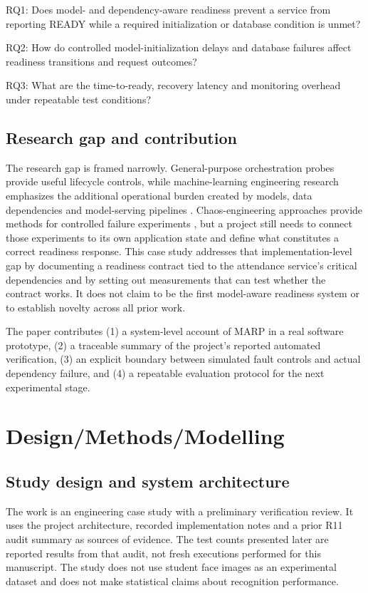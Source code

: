 \documentclass[11pt,a4paper]{article}
\begin{document}
RQ1: Does model- and dependency-aware readiness prevent a service from reporting READY while a required initialization or database condition is unmet?

RQ2: How do controlled model-initialization delays and database failures affect readiness transitions and request outcomes?

RQ3: What are the time-to-ready, recovery latency and monitoring overhead under repeatable test conditions?

\subsection{Research gap and contribution}

The research gap is framed narrowly. General-purpose orchestration probes provide useful lifecycle controls, while machine-learning engineering research emphasizes the additional operational burden created by models, data dependencies and model-serving pipelines \cite{Breck,Amershi}. Chaos-engineering approaches provide methods for controlled failure experiments \cite{Basiri}, but a project still needs to connect those experiments to its own application state and define what constitutes a correct readiness response. This case study addresses that implementation-level gap by documenting a readiness contract tied to the attendance service’s critical dependencies and by setting out measurements that can test whether the contract works. It does not claim to be the first model-aware readiness system or to establish novelty across all prior work.

The paper contributes (1) a system-level account of MARP in a real software prototype, (2) a traceable summary of the project’s reported automated verification, (3) an explicit boundary between simulated fault controls and actual dependency failure, and (4) a repeatable evaluation protocol for the next experimental stage.

\section{Design/Methods/Modelling}

\subsection{Study design and system architecture}

The work is an engineering case study with a preliminary verification review. It uses the project architecture, recorded implementation notes and a prior R11 audit summary as sources of evidence. The test counts presented later are reported results from that audit, not fresh executions performed for this manuscript. The study does not use student face images as an experimental dataset and does not make statistical claims about recognition performance.
\end{document}
